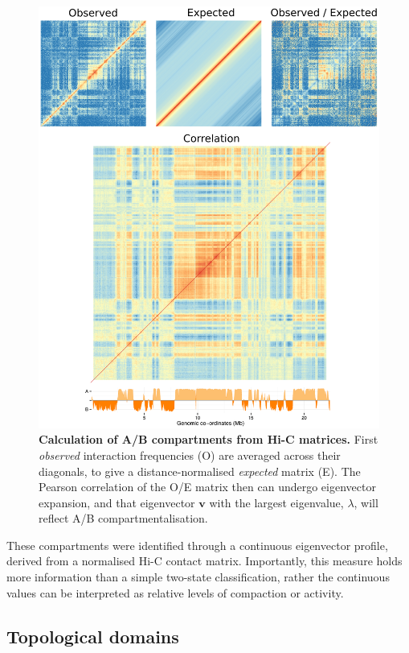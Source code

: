 \documentclass[a4paper,10pt,oneside]{book}
\begin{document}
\begin{figure}
\begin{center}
\includegraphics[width=.85\textwidth]{figs/eigcalc.pdf}
\captionsetup{width=\textwidth}
\caption{ {\bf Calculation of A/B compartments from Hi-C  matrices.} 
First \emph{observed} interaction frequencies (O) are averaged across their diagonals, to give a distance-normalised \emph{expected} matrix (E). The Pearson correlation of the O/E matrix then can undergo eigenvector expansion, and that eigenvector $\mathbf{v}$ with the largest eigenvalue, $\lambda$, will reflect A/B compartmentalisation.\cite{Lieberman2009}
}\label{fig:eigcalc}
\end{center}
\end{figure} 

These compartments were identified through a continuous eigenvector profile, derived from a normalised Hi-C contact matrix.\cite{Lieberman2009} Importantly, this measure holds more information than a simple two-state classification, rather the continuous values can be interpreted as relative levels of compaction or activity.\cite{Dekker2013, Imakaev2012}

\subsection{Topological domains}
\end{document}
